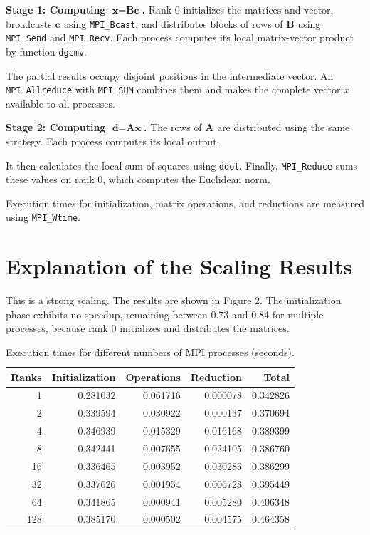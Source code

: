 \documentclass{article}
\begin{document}
\textbf{Stage 1: Computing $\textbf{x} = \textbf{Bc}$.}
Rank 0 initializes the matrices and vector, broadcasts
$\textbf{c}$ using \verb|MPI_Bcast|, and distributes blocks
of rows of $\textbf{B}$ using \verb|MPI_Send| and
\verb|MPI_Recv|. Each process computes its local
matrix-vector product by function \verb|dgemv|.

The partial results occupy disjoint positions in the
intermediate vector. An \texttt{MPI\_Allreduce} with
\texttt{MPI\_SUM} combines them and makes the complete
vector $x$ available to all processes.

\textbf{Stage 2: Computing $\textbf{d} = \textbf{Ax}$.}
The rows of $\textbf{A}$ are distributed using the same strategy.
Each process computes its local output.

It then calculates the local sum of squares using \texttt{ddot}.
Finally, \texttt{MPI\_Reduce} sums these values on
rank 0, which computes the Euclidean norm.

Execution times for initialization, matrix operations,
and reductions are measured using \texttt{MPI\_Wtime}.

\section{Explanation of the Scaling Results}

This is a strong scaling. The results are shown in Figure 2.
The initialization phase exhibits no speedup,
remaining between 0.73 and 0.84 for multiple processes,
because rank 0 initializes and distributes the matrices.

\begin{table}[htbp]
    \centering
    \label{tab:mpi_timings}
    \small
    \setlength{\tabcolsep}{5pt}
    \renewcommand{\arraystretch}{1.1}
    \begin{tabular}{r|rrrr}
        \hline
        Ranks & Initialization & Operations & Reduction & Total    \\
        \hline
        1     & 0.281032       & 0.061716   & 0.000078  & 0.342826 \\
        2     & 0.339594       & 0.030922   & 0.000137  & 0.370694 \\
        4     & 0.346939       & 0.015329   & 0.016168  & 0.389399 \\
        8     & 0.342441       & 0.007655   & 0.024105  & 0.386760 \\
        16    & 0.336465       & 0.003952   & 0.030285  & 0.386299 \\
        32    & 0.337626       & 0.001954   & 0.006728  & 0.395449 \\
        64    & 0.341865       & 0.000941   & 0.005280  & 0.406348 \\
        128   & 0.385170       & 0.000502   & 0.004575  & 0.464358 \\
        \hline
    \end{tabular}
    \caption{Execution times for different numbers of MPI processes (seconds).}
\end{table}
\end{document}
